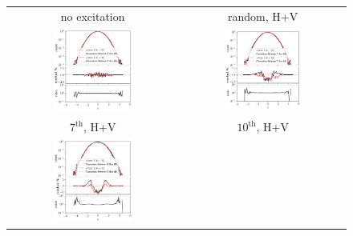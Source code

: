 \documentclass[%
 reprint,
 amsmath,amssymb,
 aps,
prstab,
longbibliography
]{revtex4-1}
\begin{document}
\begin{figure}
  \begin{tabular}{cc}
    no excitation & random, H+V \\
    \includegraphics[width=0.49\textwidth]{2016injerra2b2u_3_5um_hist_y.png} &
    \includegraphics[width=0.49\textwidth]{2016injerra2b2u_ranhv_3_5um_hist_x.png} \\
    $7^{\mathrm{th}}$, H+V & $10^{\mathrm{th}}$, H+V \\
    \includegraphics[width=0.49\textwidth]{2016injerra2b2u_t7skhv_3_5um_hist_x.png}
                  &

\end{tabular}
\end{figure}
\end{document}
